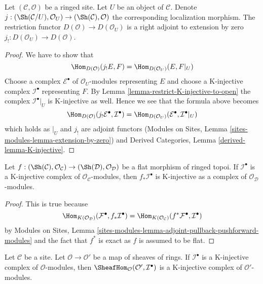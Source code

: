 \begin{lemma}
\label{lemma-adjoint-lower-shriek-restrict}
Let $(\mathcal{C}, \mathcal{O})$ be a ringed site. Let $U$ be an
object of $\mathcal{C}$. Denote
$j : (\Sh(\mathcal{C}/U), \mathcal{O}_U) \to (\Sh(\mathcal{C}), \mathcal{O})$
the corresponding localization morphism. The restriction functor
$D(\mathcal{O}) \to D(\mathcal{O}_U)$ is a right adjoint to
extension by zero $j_! : D(\mathcal{O}_U) \to D(\mathcal{O})$.
\end{lemma}

\begin{proof}
We have to show that
$$
\Hom_{D(\mathcal{O})}(j_!E, F) = \Hom_{D(\mathcal{O}_U)}(E, F|_U)
$$
Choose a complex $\mathcal{E}^\bullet$ of $\mathcal{O}_U$-modules
representing $E$ and choose
a K-injective complex $\mathcal{I}^\bullet$ representing $F$.
By Lemma \ref{lemma-restrict-K-injective-to-open} the complex
$\mathcal{I}^\bullet|_U$ is K-injective as well. Hence we see that
the formula above becomes
$$
\Hom_{D(\mathcal{O})}(j_!\mathcal{E}^\bullet, \mathcal{I}^\bullet) =
\Hom_{D(\mathcal{O}_U)}(\mathcal{E}^\bullet, \mathcal{I}^\bullet|_U)
$$
which holds as $|_U$ and $j_!$ are adjoint functors
(Modules on Sites, Lemma \ref{sites-modules-lemma-extension-by-zero})
and
Derived Categories, Lemma \ref{derived-lemma-K-injective}.
\end{proof}

\begin{lemma}
\label{lemma-K-injective-flat}
Let $f : (\Sh(\mathcal{C}), \mathcal{O}_\mathcal{C}) \to
(\Sh(\mathcal{D}), \mathcal{O}_\mathcal{D})$ be a flat morphism
of ringed topoi. If $\mathcal{I}^\bullet$ is a K-injective
complex of $\mathcal{O}_\mathcal{C}$-modules, then
$f_*\mathcal{I}^\bullet$ is K-injective
as a complex of $\mathcal{O}_\mathcal{D}$-modules.
\end{lemma}

\begin{proof}
This is true because
$$
\Hom_{K(\mathcal{O}_\mathcal{D})}(\mathcal{F}^\bullet, f_*\mathcal{I}^\bullet)
=
\Hom_{K(\mathcal{O}_\mathcal{C})}(f^*\mathcal{F}^\bullet, \mathcal{I}^\bullet)
$$
by
Modules on Sites, Lemma
\ref{sites-modules-lemma-adjoint-pullback-pushforward-modules}
and the fact that $f^*$ is exact as $f$ is assumed to be flat.
\end{proof}

\begin{lemma}
\label{lemma-hom-K-injective}
Let $\mathcal{C}$ be a site. Let $\mathcal{O} \to \mathcal{O}'$ be a map
of sheaves of rings. If $\mathcal{I}^\bullet$ is a K-injective complex of
$\mathcal{O}$-modules, then
$\SheafHom_\mathcal{O}(\mathcal{O}', \mathcal{I}^\bullet)$
is a K-injective complex of $\mathcal{O}'$-modules.
\end{lemma}

